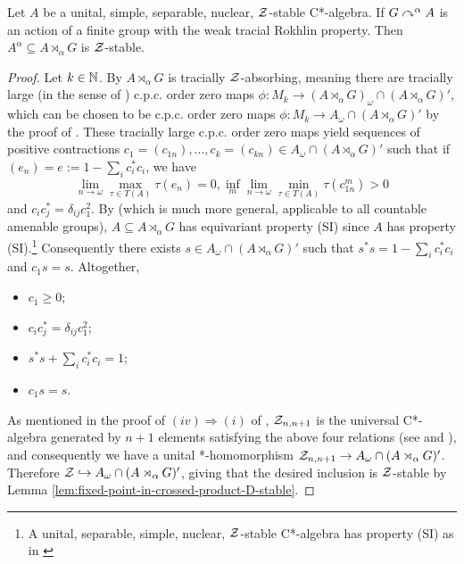 \documentclass[12pt]{amsart}
\begin{document}
      \begin{prop}\label{prop:dsi-wtr-preserves-Z}
          Let $A$ be a unital, simple, separable, nuclear, $\mathcal{Z}$-stable C*-algebra. If $G \curvearrowright^\alpha A$ is an action of a finite group with the weak tracial Rokhlin property. Then $A^\alpha \subseteq A \rtimes_\alpha G$ is $\mathcal{Z}$-stable.
            \begin{proof}
              Let $k \in \mathbb{N}$. By \cite[Theorem 5.6]{HirshbergOrovitz13} $A \rtimes_\alpha G$ is tracially $\mathcal{Z}$-absorbing, meaning there are tracially large (in the sense of \cite{TomsWhiteWinter15}) c.p.c. order zero maps $\phi: M_k \to (A \rtimes_\alpha G)_\omega \cap (A \rtimes_\alpha G)'$, which can be chosen to be c.p.c. order zero maps $\phi: M_k \to A_\omega \cap (A \rtimes_\alpha G)'$ by the proof of \cite[Lemma 5.5]{HirshbergOrovitz13}. These tracially large c.p.c. order zero maps yield sequences of positive contractions $c_1 = (c_{1n}),\dots,c_k = (c_{kn}) \in A_\omega \cap (A \rtimes_\alpha G)'$ such that if $(e_n) = e := 1 - \sum_i c_i^*c_i$, we have
\begin{equation}
              \lim_{n \to \omega} \max_{\tau \in T(A)} \tau(e_n) = 0, \inf_m \lim _{n \to \omega} \min_{\tau \in T(A)} \tau(c_{1n}^m) > 0 
\end{equation}
              and $c_ic_j^* = \delta_{ij}c_1^2$. By \cite[Proposition 4.11]{GardellaHirshberg18} (which is much more general, applicable to all countable amenable groups), $A \subseteq A \rtimes_\alpha G$ has equivariant property (SI) since $A$ has property (SI).\footnote{A unital, separable, simple, nuclear, $\mathcal{Z}$-stable C*-algebra has property (SI) as in \cite{MatuiSato12}} Consequently there exists $s \in A_\omega \cap (A \rtimes_\alpha G)'$ such that $s^*s = 1 - \sum_i c_i^*c_i$ and $c_1s = s$. Altogether,
                \begin{itemize}
                  \item $c_1 \geq 0$;
                  \item $c_ic_j^* = \delta_{ij}c_1^2$;
                  \item $s^*s + \sum_i c_i^*c_i = 1$;
                  \item $c_1s = s$. 
                \end{itemize}
                As mentioned in the proof of $(iv) \Rightarrow (i)$ of \cite{MatuiSato12}, $\mathcal{Z}_{n,n+1}$ is the universal C*-algebra generated by $n+1$ elements satisfying the above four relations (see \cite[Proposition 5.1]{RordamWinter10} and \cite[Proposition 2.1]{Sato10}), and consequently we have a unital *-homomorphism $\mathcal{Z}_{n,n+1} \to A_\omega \cap (A \rtimes_\alpha G)'$. Therefore $\mathcal{Z} \hookrightarrow A_\omega \cap (A \rtimes_\alpha G)'$, giving that the desired inclusion is $\mathcal{Z}$-stable by Lemma \ref{lem:fixed-point-in-crossed-product-D-stable}.
            \end{proof}
        \end{prop}
\end{document}
